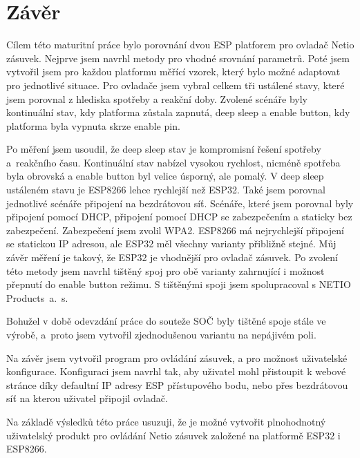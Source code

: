 \documentclass[a4paper, 12pt]{report}
\begin{document}
    \chapter{Závěr}
    Cílem této maturitní práce bylo porovnání dvou ESP platforem pro ovladač Netio zásuvek.
    Nejprve jsem navrhl metody pro vhodné srovnání parametrů.
    Poté jsem vytvořil jsem pro každou platformu měřící vzorek, který bylo možné adaptovat pro jednotlivé situace.
    Pro ovladače jsem vybral celkem tři ustálené stavy, které jsem porovnal z hlediska spotřeby a reakční doby.
    Zvolené scénáře byly kontinuální stav, kdy platforma zůstala zapnutá, deep sleep a enable button, kdy platforma byla vypnuta skrze enable pin.\par
    Po měření jsem usoudil, že deep sleep stav je kompromisní řešení spotřeby a~reakčního času.
    Kontinuální stav nabízel vysokou rychlost, nicméně spotřeba byla obrovská a enable button byl velice úsporný, ale pomalý.
    V deep sleep ustáleném stavu je ESP8266 lehce rychlejší než ESP32.
    Také jsem porovnal jednotlivé scénáře připojení na bezdrátovou síť.
    Scénáře, které jsem porovnal byly připojení pomocí DHCP, připojení pomocí DHCP se zabezpečením a staticky bez zabezpečení.
    Zabezpečení jsem zvolil WPA2.
    ESP8266 má nejrychlejší připojení se statickou IP adresou, ale ESP32 měl všechny varianty přibližně stejné.
    Můj závěr měření je takový, že ESP32 je vhodnější pro ovladač zásuvek.
    Po zvolení této metody jsem navrhl tištěný spoj pro obě varianty zahrnující i možnost přepnutí do enable button režimu.
    S tištěnými spoji jsem spolupracoval s NETIO Products~a.~s.\par
    Bohužel v době odevzdání práce do souteže SOČ byly tištěné spoje stále ve výrobě, a~proto jsem vytvořil zjednodušenou variantu na nepájivém poli.\par
    Na závěr jsem vytvořil program pro ovládání zásuvek, a pro možnost uživatelské konfigurace.
    Konfiguraci jsem navrhl tak, aby uživatel mohl přistoupit k webové stránce díky defaultní IP adresy ESP přístupového bodu, nebo přes bezdrátovou síť na kterou uživatel připojil ovladač.\par
    Na základě výsledků této práce usuzuji, že je možné vytvořit plnohodnotný uživatelský produkt pro ovládání Netio zásuvek založené na platformě ESP32 i ESP8266.

    \renewcommand\listoflistingscaption{Seznam úryvků kódu}
    \listoflistings
    \listoftables

    \listoffigures
\end{document}
